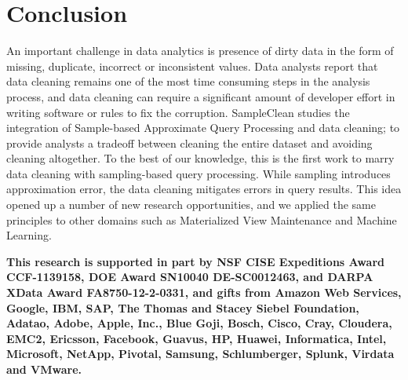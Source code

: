 \section{Conclusion}
An important challenge in data analytics is presence of dirty data
in the form of missing, duplicate, incorrect or inconsistent values.
Data analysts report that data cleaning remains one of the most time
consuming steps in the analysis process, and data cleaning can require
a significant amount of developer effort in writing software or rules
to fix the corruption. 
SampleClean studies the integration of Sample-based Approximate Query Processing and data cleaning; to provide analysts a tradeoff between cleaning the entire dataset and avoiding cleaning altogether.
To the best of our knowledge, this is the first work to marry data cleaning with sampling-based query processing.
While sampling introduces approximation error, the data cleaning mitigates errors in query results.
This idea opened up a number of new research opportunities, and we applied the same principles to other domains such as Materialized View Maintenance and Machine Learning.

\vspace{1.5em}

\textbf{\small This research is supported in part by NSF CISE Expeditions Award CCF-1139158, DOE Award SN10040 DE-SC0012463, and DARPA XData Award FA8750-12-2-0331, and gifts from Amazon Web Services, Google, IBM, SAP, The Thomas and Stacey Siebel Foundation, Adatao, Adobe, Apple, Inc., Blue Goji, Bosch, Cisco, Cray, Cloudera, EMC2, Ericsson, Facebook, Guavus, HP, Huawei, Informatica, Intel, Microsoft, NetApp, Pivotal, Samsung, Schlumberger, Splunk, Virdata and VMware.}